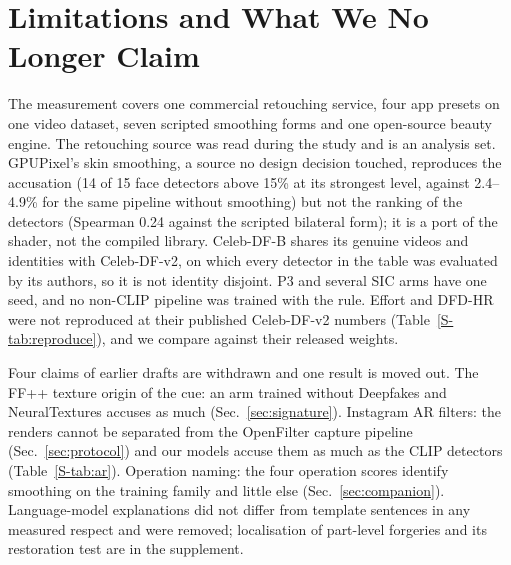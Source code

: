 \documentclass[conference]{IEEEtran}
\begin{document}
\section{Limitations and What We No Longer Claim}
\label{sec:limits}
The measurement covers one commercial retouching service, four app presets on one video dataset, seven scripted smoothing
forms and one open-source beauty engine. The retouching source was read during the study and is an analysis set. GPUPixel's
skin smoothing, a source no design decision touched, reproduces the accusation (14 of 15 face detectors above
15\% at its strongest level, against 2.4--4.9\% for the same pipeline without smoothing) but not the ranking of the detectors (Spearman
0.24 against the scripted bilateral form); it is a port of the shader, not the compiled library.
 Celeb-DF-B shares its genuine videos
and identities with Celeb-DF-v2, on which every detector in the table was evaluated by its authors, so it is not identity
disjoint. P3 and several SIC arms have one seed, and no non-CLIP pipeline was trained with the rule. Effort and DFD-HR were
not reproduced at their published Celeb-DF-v2 numbers (Table~\ref{S-tab:reproduce}), and we compare against their released
weights.

Four claims of earlier drafts are withdrawn and one result is moved out. The FF++ texture origin of the cue: an arm trained
without Deepfakes and NeuralTextures accuses as much (Sec.~\ref{sec:signature}). Instagram AR filters: the renders cannot be separated from the OpenFilter
capture pipeline (Sec.~\ref{sec:protocol}) and our models accuse them as much as the CLIP detectors (Table~\ref{S-tab:ar}).
Operation naming: the four operation scores identify smoothing on the training family and little else
(Sec.~\ref{sec:companion}). Language-model explanations did not differ from template sentences in any measured respect and
were removed; localisation of part-level forgeries and its restoration test are in the supplement.

\end{document}

